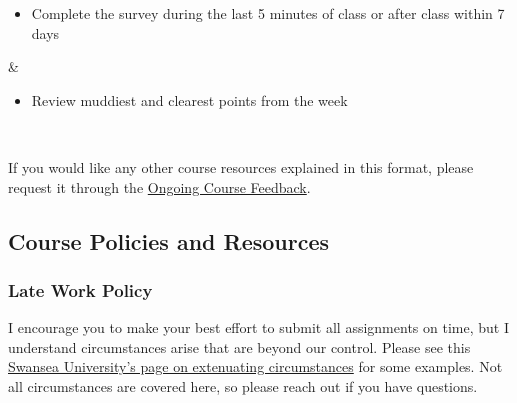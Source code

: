 \documentclass[
  letterpaper,
  DIV=11,
  numbers=noendperiod]{scrartcl}
\providecommand{\tightlist}{%
  \setlength{\itemsep}{0pt}\setlength{\parskip}{0pt}}\usepackage{longtable,booktabs,array}
\begin{document}
\begin{longtable}[]
\begin{minipage}[t]{\linewidth}
\begin{itemize}
\item
  Complete the survey during the last 5 minutes of class or after class
  within 7 days
\end{itemize}
\end{minipage} & \begin{minipage}[t]{\linewidth}\raggedright
\begin{itemize}
\tightlist
\item
  Review muddiest and clearest points from the week
\end{itemize}
\end{minipage} \\
\end{longtable}

If you would like any other course resources explained in this format,
please request it through the
\href{https://forms.office.com/Pages/ResponsePage.aspx?id=V3lz4rj6fk2U9pvWr59xWFMopmPUjRtDiHLswhgacNhURDc2S1dGNTlTRVJVUFoyQUUzNFJMS0JXUi4u}{Ongoing
Course Feedback}.~

\hypertarget{course-policies-and-resources}{%
\subsection{Course Policies and
Resources}\label{course-policies-and-resources}}

\hypertarget{late-work-policy}{%
\subsubsection{Late Work Policy}\label{late-work-policy}}

I encourage you to make your best effort to submit all assignments on
time, but I understand circumstances arise that are beyond our control.
Please see this
\href{https://myuni.swansea.ac.uk/academic-life/extenuating-circumstances/\#how-can-the-university-support-me-and-what-should-i-do=is-expanded\&what-are-extenuating-circumstances=is-expanded\&what-isnt-an-extenuating-circumstance=is-expanded\&what-supporting-evidence-is-required=is-expanded\&who-should-i-contact-to-make-an-extenuating-circumstances-application=is-expanded\&who-will-make-a-decision-on-my-application=is-expanded}{Swansea
University's page on extenuating circumstances} for some examples. Not
all circumstances are covered here, so please reach out if you have
questions.~
\end{document}

